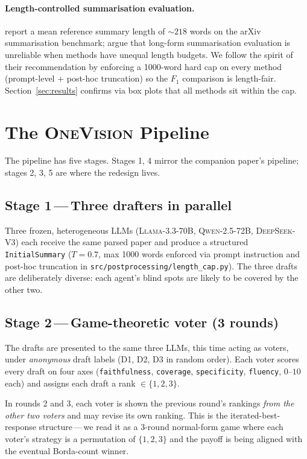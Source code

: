 \documentclass[11pt,a4paper]{article}
\begin{document}
\paragraph{Length-controlled summarisation evaluation.}
\citet{cohan2018discourse} report a mean reference summary length of
$\sim 218$ words on the arXiv summarisation benchmark; \citet{krishna2023longeval}
argue that long-form summarisation evaluation is unreliable when
methods have unequal length budgets. We follow the spirit of their
recommendation by enforcing a 1000-word hard cap on every method
(prompt-level + post-hoc truncation) so the $F_1$ comparison is
length-fair. Section~\ref{sec:results} confirms via box plots that
all methods sit within the cap.

\section{The \textsc{OneVision} Pipeline}
\label{sec:method}

The pipeline has five stages. Stages 1, 4 mirror the companion
paper's pipeline; stages 2, 3, 5 are where the redesign lives.

\subsection*{Stage 1\,---\,Three drafters in parallel}
Three frozen, heterogeneous LLMs (\textsc{Llama-3.3-70B},
\textsc{Qwen-2.5-72B}, \textsc{DeepSeek-V3}) each receive the same
parsed paper and produce a structured \texttt{InitialSummary}
($T\!=\!0.7$, max 1000 words enforced via prompt instruction and
post-hoc truncation in \texttt{src/postprocessing/length\_cap.py}).
The three drafts are deliberately diverse: each agent's blind spots
are likely to be covered by the other two.

\subsection*{Stage 2\,---\,Game-theoretic voter (3 rounds)}
The drafts are presented to the same three LLMs, this time acting
as voters, under \emph{anonymous} draft labels (D1, D2, D3 in random
order). Each voter scores every draft on four axes
(\texttt{faithfulness}, \texttt{coverage}, \texttt{specificity},
\texttt{fluency}, $0$--$10$ each) and assigns each draft a rank
$\in\{1,2,3\}$.

In rounds 2 and 3, each voter is shown the previous round's rankings
\emph{from the other two voters} and may revise its own ranking. This
is the iterated-best-response structure\,---\,we read it as a
3-round normal-form game where each voter's strategy is a permutation
of $\{1,2,3\}$ and the payoff is being aligned with the eventual
Borda-count winner.
\end{document}
